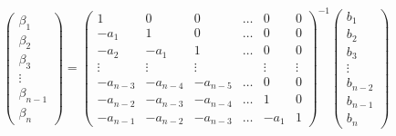         \begin{equation}
            \begin{pmatrix}
                \beta_1 \\
                \beta_2 \\
                \beta_3 \\
                \vdots \\
                \beta_{n-1} \\
                \beta_{n}
            \end{pmatrix} =
            \begin{pmatrix}
            1 & 0 & 0 & \dots & 0 & 0 \\
            -a_{1} & 1 & 0 & \dots & 0 & 0 \\
            -a_{2} & -a_{1} & 1 & \dots & 0 & 0 \\
            \vdots & \vdots & \vdots & & \vdots & \vdots \\
            -a_{n-3} & -a_{n-4} & -a_{n-5} & \dots & 0 & 0 \\
            -a_{n-2} & -a_{n-3} & -a_{n-4} & \dots & 1 & 0 \\
            -a_{n-1} & -a_{n-2} & -a_{n-3} & \dots  & -a_{1} & 1
            \end{pmatrix} ^{-1}
            \begin{pmatrix}
                b_1 \\
                b_2 \\
                b_3 \\
                \vdots \\
                b_{n-2} \\
                b_{n-1} \\
                b_{n}
            \end{pmatrix}
        \end{equation}

